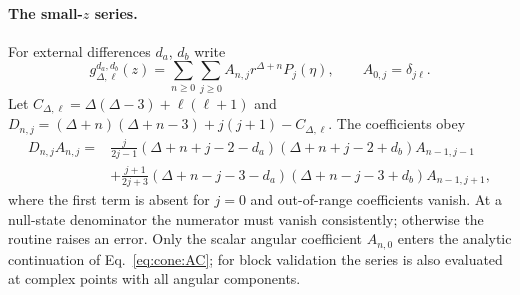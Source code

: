 \documentclass[11pt,a4paper]{article}
\numberwithin{equation}{section}
\begin{document}
\paragraph{The small-$z$ series.} For external differences $d_a$, $d_b$ write
\begin{equation}
 g_{\Delta,\ell}^{d_a,d_b}(z)=\sum_{n\ge0}\sum_{j\ge0}A_{n,j}r^{\Delta+n}P_j(\eta),\qquad A_{0,j}=\delta_{j\ell}.
\end{equation}
Let $C_{\Delta,\ell}=\Delta(\Delta-3)+\ell(\ell+1)$ and $D_{n,j}=(\Delta+n)(\Delta+n-3)+j(j+1)-C_{\Delta,\ell}$. The
coefficients obey
\begin{equation}
\begin{aligned}
 D_{n,j}A_{n,j}={}&\frac{j}{2j-1}(\Delta+n+j-2-d_a)(\Delta+n+j-2+d_b)A_{n-1,j-1}\\
 &+\frac{j+1}{2j+3}(\Delta+n-j-3-d_a)(\Delta+n-j-3+d_b)A_{n-1,j+1},
\end{aligned}
 \label{eq:cone:zrec}
\end{equation}
where the first term is absent for $j=0$ and out-of-range coefficients vanish. At a null-state denominator the
numerator must vanish consistently; otherwise the routine raises an error. Only the scalar angular coefficient
$A_{n,0}$ enters the analytic continuation of Eq.~\eqref{eq:cone:AC}; for block validation the series is also evaluated
at complex points with all angular components.
\end{document}
